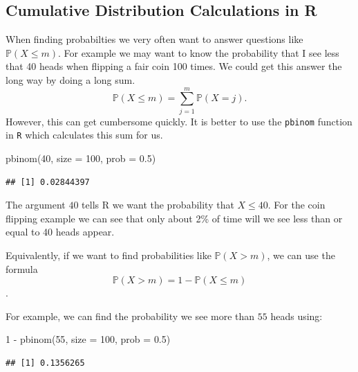 \documentclass[
]{book}
\newenvironment{Shaded}{\begin{snugshade}}{\end{snugshade}}
\newcommand{\AttributeTok}[1]{\textcolor[rgb]{0.77,0.63,0.00}{#1}}
\newcommand{\DecValTok}[1]{\textcolor[rgb]{0.00,0.00,0.81}{#1}}
\newcommand{\FloatTok}[1]{\textcolor[rgb]{0.00,0.00,0.81}{#1}}
\newcommand{\FunctionTok}[1]{\textcolor[rgb]{0.00,0.00,0.00}{#1}}
\newcommand{\NormalTok}[1]{#1}
\newcommand{\SpecialCharTok}[1]{\textcolor[rgb]{0.00,0.00,0.00}{#1}}
\theoremstyle{definition}
\theoremstyle{definition}
\theoremstyle{definition}
\theoremstyle{definition}
\theoremstyle{remark}
\begin{document}
\hypertarget{cumulative-distribution-calculations-in-r}{%
\subsection{Cumulative Distribution Calculations in R}\label{cumulative-distribution-calculations-in-r}}

When finding probabilties we very often want to answer questions like \(\mathbb{P}(X\leq m)\). For example we may want to know the probability that I see less that 40 heads when flipping a fair coin 100 times. We could get this answer the long way by doing a long sum.
\[\mathbb{P}(X\leq m)=\sum_{j=1}^m \mathbb{P}(X=j).\] However, this can get cumbersome quickly. It is better to use the \texttt{pbinom} function in \texttt{R} which calculates this sum for us.

\begin{Shaded}
\begin{Highlighting}[]
\FunctionTok{pbinom}\NormalTok{(}\DecValTok{40}\NormalTok{, }\AttributeTok{size =} \DecValTok{100}\NormalTok{, }\AttributeTok{prob =} \FloatTok{0.5}\NormalTok{)}
\end{Highlighting}
\end{Shaded}

\begin{verbatim}
## [1] 0.02844397
\end{verbatim}

The argument \(40\) tells R we want the probability that \(X \leq 40\). For the coin flipping example we can see that only about 2\% of time will we see less than or equal to 40 heads appear.

Equivalently, if we want to find probabilities like \(\mathbb{P}(X>m)\), we can use the formula \[\mathbb{P}(X>m)=1-\mathbb{P}(X\leq m)\].

For example, we can find the probability we see more than \(55\) heads using:

\begin{Shaded}
\begin{Highlighting}[]
\DecValTok{1} \SpecialCharTok{{-}} \FunctionTok{pbinom}\NormalTok{(}\DecValTok{55}\NormalTok{, }\AttributeTok{size =} \DecValTok{100}\NormalTok{, }\AttributeTok{prob =} \FloatTok{0.5}\NormalTok{)}
\end{Highlighting}
\end{Shaded}

\begin{verbatim}
## [1] 0.1356265
\end{verbatim}
\end{document}
